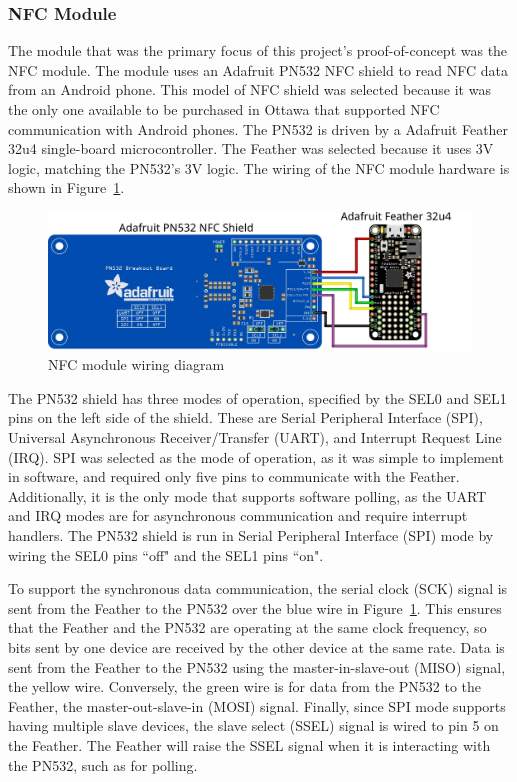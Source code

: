 \documentclass[12pt]{report}
\let\Oldsubsubsection\subsubsection
\renewcommand{\subsubsection}{\FloatBarrier\Oldsubsubsection}
\begin{document}
\subsubsection{NFC Module} \label{nfc-modules}

The module that was the primary focus of this project's proof-of-concept was the NFC module. The module uses an Adafruit 
PN532 NFC shield to read NFC data from an Android phone. This model of NFC shield was selected because it was the only 
one available to be purchased in Ottawa that supported NFC communication with Android phones. The PN532 is driven by a 
Adafruit Feather 32u4 single-board microcontroller. The Feather was selected because it uses 3V logic, matching the 
PN532's 3V logic. The wiring of the NFC module hardware is shown in Figure~\ref{fig:nfc-module-wiring}.

\begin{figure}
    \includegraphics[width=\textwidth]{Diagrams/Hardware-Diagrams/nfc_module}
    \caption{NFC module wiring diagram}
    \label{fig:nfc-module-wiring}
\end{figure}

The PN532 shield has three modes of operation, specified by the SEL0 and SEL1 pins on the left side of the shield. 
These are Serial Peripheral Interface (SPI), Universal Asynchronous Receiver/Transfer (UART), and Interrupt Request 
Line (IRQ). SPI was selected as the mode of operation, as it was simple to implement in software, and required only five 
pins to communicate with the Feather. Additionally, it is the only mode that supports software polling, as the UART 
and IRQ modes are for asynchronous communication and require interrupt handlers. The PN532 shield is run in Serial 
Peripheral Interface (SPI) mode by wiring the SEL0 pins ``off" and the SEL1 pins ``on".

To support the synchronous data communication, the serial clock (SCK) signal is sent from the Feather to the PN532 over 
the blue wire in Figure~\ref{fig:nfc-module-wiring}. This ensures that the Feather and the PN532 are operating at the same 
clock frequency, so bits sent by one device are received by the other device at the same rate. Data is sent from the 
Feather to the PN532 using the master-in-slave-out (MISO) signal, the yellow wire. Conversely, the green wire is for 
data from the PN532 to the Feather, the master-out-slave-in (MOSI) signal. Finally, since SPI mode supports having 
multiple slave devices, the slave select (SSEL) signal is wired to pin 5 on the Feather. The Feather will raise the 
SSEL signal when it is interacting with the PN532, such as for polling.
\end{document}
